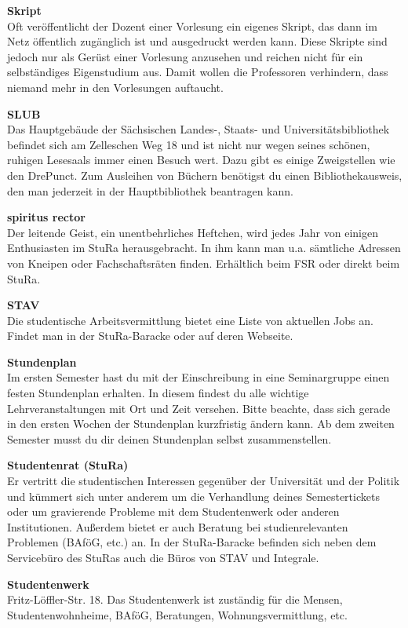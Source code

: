 \textbf{Skript} \\
Oft veröffentlicht der Dozent einer Vorlesung ein eigenes Skript, das dann im Netz öffentlich zugänglich ist und ausgedruckt werden kann.
Diese Skripte sind jedoch nur als Gerüst einer Vorlesung anzusehen und reichen nicht für ein selbständiges Eigenstudium aus.
Damit wollen die Professoren verhindern, dass niemand mehr in den Vorlesungen auftaucht.

\textbf{SLUB} \\
Das Hauptgebäude der Sächsischen Landes-, Staats- und Universitätsbibliothek befindet sich am Zelleschen Weg 18 und ist nicht nur wegen seines schönen, ruhigen Lesesaals immer einen Besuch wert.
Dazu gibt es einige Zweigstellen wie den DrePunct.
Zum Ausleihen von Büchern benötigst du einen Bibliothekausweis, den man jederzeit in der Hauptbibliothek beantragen kann.

\textbf{spiritus rector} \\
Der \glqq leitende Geist\grqq , ein unentbehrliches Heftchen, wird jedes Jahr von einigen Enthusiasten im StuRa herausgebracht.
In ihm kann man u.a. sämtliche Adressen von Kneipen oder Fachschaftsräten finden.
Erhältlich beim FSR oder direkt beim StuRa.

\textbf{STAV} \\
Die studentische Arbeitsvermittlung bietet eine Liste von aktuellen Jobs an.
Findet man in der StuRa-Baracke oder auf deren Webseite.

\textbf{Stundenplan} \\
Im ersten Semester hast du mit der Einschreibung in eine Seminargruppe einen festen Stundenplan erhalten. In diesem findest du alle wichtige Lehrveranstaltungen mit Ort und Zeit versehen. Bitte beachte, dass sich gerade in den ersten Wochen der Stundenplan kurzfristig ändern kann.
Ab dem zweiten Semester musst du dir deinen Stundenplan selbst zusammenstellen.

\textbf{Studentenrat (StuRa)} \\
Er vertritt die studentischen Interessen gegenüber der Universität und der Politik und kümmert sich unter anderem um die Verhandlung deines Semestertickets oder um gravierende Probleme mit dem Studentenwerk oder anderen Institutionen.
Außerdem bietet er auch Beratung bei studienrelevanten Problemen (BAföG, etc.) an.
In der StuRa-Baracke befinden sich neben dem Servicebüro des StuRas auch die Büros von STAV und Integrale.

\textbf{Studentenwerk} \\
Fritz-Löffler-Str. 18.
Das Studentenwerk ist zuständig für die Mensen, Studentenwohnheime, BAföG, Beratungen, Wohnungsvermittlung, etc.

